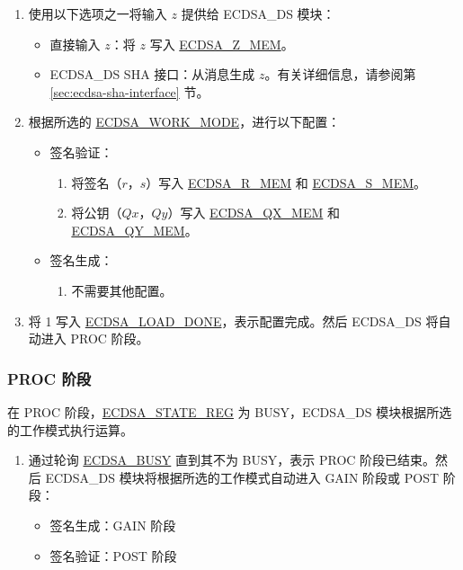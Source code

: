\documentclass[main\_\_CN.tex]{subfiles}
\begin{document}
\begin{enumerate}
	\item 使用以下选项之一将输入 $z$ 提供给 ECDSA\_DS 模块：
	      \begin{itemize}
		      \item 直接输入 $z$：将 $z$ 写入 \hyperref[tab:ecdsa-memory]{ECDSA\_Z\_MEM}。
		      \item ECDSA\_DS SHA 接口：从消息生成 $z$。有关详细信息，请参阅第 \ref{sec:ecdsa-sha-interface} 节。
	      \end{itemize}
	\item 根据所选的 \hyperref[fielddesc:ECDSAWORKMODE]{ECDSA\_WORK\_MODE}，进行以下配置：
	      \begin{itemize}
		      \item 签名验证：
		            \begin{enumerate}
			            \item 将签名（$r$，$s$）写入 \hyperref[tab:ecdsa-memory]{ECDSA\_R\_MEM} 和 \hyperref[tab:ecdsa-memory]{ECDSA\_S\_MEM}。
			            \item 将公钥（$Qx$，$Qy$）写入 \hyperref[tab:ecdsa-memory]{ECDSA\_QX\_MEM} 和 \hyperref[tab:ecdsa-memory]{ECDSA\_QY\_MEM}。
		            \end{enumerate}
		      \item 签名生成：
		            \begin{enumerate}
			            \item 不需要其他配置。
		            \end{enumerate}
	      \end{itemize}
	\item 将 1 写入 \hyperref[fielddesc:ECDSALOADDONE]{ECDSA\_LOAD\_DONE}，表示配置完成。然后 ECDSA\_DS 将自动进入 PROC 阶段。
\end{enumerate}

\subsubsection{PROC 阶段}

在 PROC 阶段，\hyperref[regdesc:ECDSASTATEREG]{ECDSA\_STATE\_REG} 为 BUSY，ECDSA\_DS 模块根据所选的工作模式执行运算。

\begin{enumerate}
	\item 通过轮询 \hyperref[fielddesc:ECDSABUSY]{ECDSA\_BUSY} 直到其不为 BUSY，表示 PROC 阶段已结束。然后 ECDSA\_DS 模块将根据所选的工作模式自动进入 GAIN 阶段或 POST 阶段：
	      \begin{itemize}
		      \item 签名生成：GAIN 阶段
		      \item 签名验证：POST 阶段
	      \end{itemize}
\end{enumerate}
\end{document}
